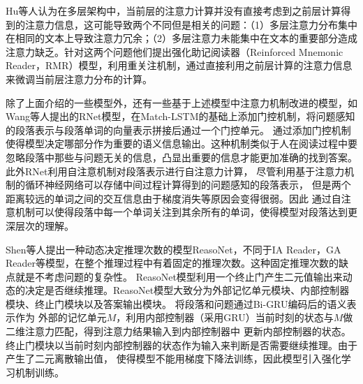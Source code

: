 \noindent Hu等人认为在多层架构中，当前层的注意力计算并没有直接考虑到之前层计算得到的注意力信息，这可能导致两个不同但是相关的问题：（1）多层注意力分布集中在相同的文本上导致注意力冗余；（2）多层注意力未能集中在文本的重要部分造成注意力缺乏。针对这两个问题他们提出强化助记阅读器（Reinforced Mnemonic Reader，RMR）模型，利用重关注机制，通过直接利用之前层计算的注意力信息来微调当前层注意力分布的计算。

除了上面介绍的一些模型外，还有一些基于上述模型中注意力机制改进的模型，如Wang等人提出的RNet模型，在Match-LSTM的基础上添加门控机制，将问题感知的段落表示与段落单词的向量表示拼接后通过一个门控单元。
通过添加门控机制使得模型决定哪部分作为重要的语义信息输出。这种机制类似于人在阅读过程中要
忽略段落中那些与问题无关的信息，凸显出重要的信息才能更加准确的找到答案。
此外RNet利用自注意机制对段落表示进行自注意力计算，
尽管利用基于注意力机制的循环神经网络可以存储中间过程计算得到的问题感知的段落表示，
但是两个距离较远的单词之间的交互信息由于梯度消失等原因会变得很弱。因此
通过自注意机制可以使得段落中每一个单词关注到其余所有的单词，使得模型对段落达到更深层次的理解。

Shen等人提出一种动态决定推理次数的模型ReasoNet，不同于IA Reader，GA Reader等模型，在整个推理过程中有着固定的推理次数。这种固定推理次数的缺点就是不考虑问题的复杂性。
ReasoNet模型利用一个终止门产生二元值输出来动态的决定是否继续推理。ReasoNet模型大致分为外部记忆单元模块、内部控制器模块、终止门模块以及答案输出模块。
将段落和问题通过Bi-GRU编码后的语义表示作为
外部的记忆单元$M$，利用内部控制器（采用GRU）当前时刻的状态与$M$做二维注意力匹配，得到注意力结果输入到内部控制器中
更新内部控制器的状态。终止门模块以当前时刻内部控制器的状态作为输入来判断是否需要继续推理。由于产生了二元离散输出值，
使得模型不能用梯度下降法训练，因此模型引入强化学习机制训练。

